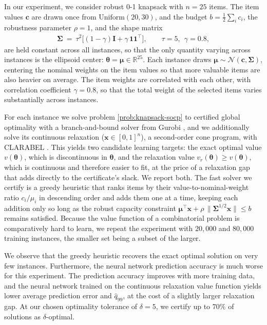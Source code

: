 \documentclass[10pt]{article} %
\theoremstyle{plain}
\theoremstyle{definition}
\theoremstyle{remark}
\begin{document}
In our experiment, we consider robust 0-1 knapsack with $n=25$ items. The item values $\mathbf{c}$ are drawn once from $\mathrm{Uniform}(20, 30)$, and the budget $b = \tfrac{1}{2}\sum_i c_i$, the robustness parameter $\rho = 1$, and the shape matrix
\begin{align*}
    \bm{\Sigma} ~=~ \tau^2 \big[ (1 - \gamma) \mathbf{I} + \gamma \, \mathbf{1}\mathbf{1}^\top \big], \qquad \tau = 5, ~~ \gamma = 0.8,
\end{align*}
are held constant across all instances, so that the only quantity varying across instances is the ellipsoid center: $\bm{\theta} = \bm{\mu} \in \mathbb{R}^{25}$. Each instance draws $\bm{\mu} \sim \mathcal{N}(\mathbf{c}, \bm{\Sigma})$, centering the nominal weights on the item values so that more valuable items are also heavier on average. The item weights are correlated with each other, with correlation coefficient $\gamma = 0.8$, so that the total weight of the selected items varies substantially across instances.

For each instance we solve problem \cref{prob:knapsack-socp}{}{} to certified global optimality with a branch-and-bound solver from Gurobi \citep{gurobi}, and we additionally solve its continuous relaxation ($\mathbf{x} \in [0,1]^n$), a second-order cone program, with CLARABEL \citep{clarabel}. This yields two candidate learning targets: the exact optimal value $v(\bm{\theta})$, which is discontinuous in $\bm{\theta}$, and the relaxation value $v_r(\bm{\theta}) \geq v(\bm{\theta})$, which is continuous and therefore easier to fit, at the price of a relaxation gap that adds directly to the certificate's slack. We report both.
The fast solver we certify is a greedy heuristic that ranks items by their value-to-nominal-weight ratio $c_i / \mu_i$ in descending order and adds them one at a time, keeping each addition only so long as the robust capacity constraint $\bm{\mu}^\top \mathbf{x} + \rho\,\|\bm{\Sigma}^{1/2}\mathbf{x}\| \le b$ remains satisfied.
Because the value function of a combinatorial problem is comparatively hard to learn, we repeat the experiment with $20{,}000$ and $80{,}000$ training instances, the smaller set being a subset of the larger.

We observe that the greedy heuristic recovers the exact optimal solution on very few instances. Furthermore, the neural network prediction accuracy is much worse for this experiment. The prediction accuracy improves with more training data, and the neural network trained on the continuous relaxation value function yields lower average prediction error and $\hat{q}_{99}$, at the cost of a slightly larger relaxation gap. At our chosen optimality tolerance of $\delta = 5$, we certify up to $70\%$ of solutions as $\delta$-optimal.
\end{document}
